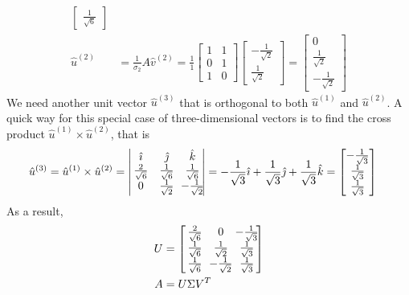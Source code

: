 \begin{solution}
\begin{align*}
\begin{bmatrix}
\frac{1}{\sqrt{6}} 
\end{bmatrix} \\
\hat{u}^{(2)} &= \frac{1}{\sigma_2} A\hat{v}^{(2)} = \frac{1}{1}
\begin{bmatrix}
1 & 1 \\
0 & 1 \\
1 & 0
\end{bmatrix}
\begin{bmatrix}
-\frac{1}{\sqrt{2}} \\
\frac{1}{\sqrt{2}}
\end{bmatrix}
=
\begin{bmatrix}
0 \\
\frac{1}{\sqrt{2}} \\
-\frac{1}{\sqrt{2}} 
\end{bmatrix}
\end{align*}
We need another unit vector $\hat{u}^{(3)}$ that is orthogonal to both $\hat{u}^{(1)}$ and $\hat{u}^{(2)}$. A quick way for this special case of three-dimensional vectors is to find the cross product $\hat{u}^{(1)} \times \hat{u}^{(2)}$, that is
\begin{align*}
\hat{u}^{(3)} &= \hat{u}^{(1)} \times \hat{u}^{(2)} =
\left|\begin{array}{@{\,}wc{13pt}wc{13pt}wc{13pt}@{\,}}
\hat{\imath} & \hat{\jmath} & \hat{k} \\
\frac{2}{\sqrt{6}} & \frac{1}{\sqrt{6}} & \frac{1}{\sqrt{6}}  \\
0 & \frac{1}{\sqrt{2}} & -\frac{1}{\sqrt{2}}
\end{array}\right|
= -\frac{1}{\sqrt{3}} \hat{\imath} + \frac{1}{\sqrt{3}} \hat{\jmath} + \frac{1}{\sqrt{3}} \hat{k}
=
\begin{bmatrix}
-\frac{1}{\sqrt{3}} \\
\frac{1}{\sqrt{3}} \\
\frac{1}{\sqrt{3}}
\end{bmatrix}
\end{align*} 
As a result,
\begin{align*}
U &=
\left[\begin{array}{@{\,}wc{13pt}wc{13pt}wc{13pt}@{\,}}
\frac{2}{\sqrt{6}} & 0 & -\frac{1}{\sqrt{3}} \\
\frac{1}{\sqrt{6}} & \frac{1}{\sqrt{2}} & \frac{1}{\sqrt{3}}\\
\frac{1}{\sqrt{6}} & -\frac{1}{\sqrt{2}} & \frac{1}{\sqrt{3}}
\end{array}\right] \\
A &= U\Sigma V^T \\

\end{align*}
\end{solution}

